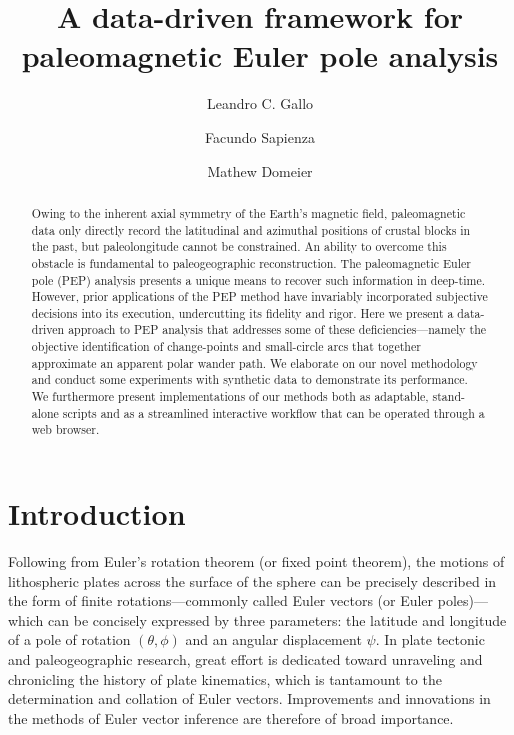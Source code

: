 \documentclass{article} %
\title{A data-driven framework for paleomagnetic Euler pole analysis}
\author[1\thanks{\tt{l.c.gallo@geo.uio.no}}]{Leandro C. Gallo\orcidA{}}
\author[2]{Facundo Sapienza\orcidB{}}
\author[1]{Mathew Domeier\orcidC{}}
\affil[1]{Centre for Earth Evolution and Dynamics, University of Oslo, Norway}
\affil[2]{Department of Statistics, University of California Berkeley, United States}
\begin{document}
  \begin{@twocolumnfalse} %
  
\maketitle

\begin{abstract}
Owing to the inherent axial symmetry of the Earth’s magnetic field, paleomagnetic data only directly record the latitudinal and azimuthal positions of crustal blocks in the past, but paleolongitude cannot be constrained. An ability to overcome this obstacle is fundamental to paleogeographic reconstruction. The paleomagnetic Euler pole (PEP) analysis presents a unique means to recover such information in deep-time. However, prior applications of the PEP method have invariably incorporated subjective decisions into its execution, undercutting its fidelity and rigor. Here we present a data-driven approach to PEP analysis that addresses some of these deficiencies---namely the objective identification of change-points and small-circle arcs that together approximate an apparent polar wander path. We elaborate on our novel methodology and conduct some experiments with synthetic data to demonstrate its performance. We furthermore present implementations of our methods both as adaptable, stand-alone scripts and as a streamlined interactive workflow that can be operated through a web browser.
\end{abstract}
\vspace{0.35cm}

  \end{@twocolumnfalse} %




\section{Introduction}
Following from Euler's rotation theorem (or fixed point theorem), the motions of lithospheric plates across the surface of the sphere can be precisely described in the form of finite rotations---commonly called Euler vectors (or Euler poles)---which can be concisely expressed by three parameters: the latitude and longitude of a pole of rotation $(\theta, \phi)$ and an angular displacement $\psi$. In plate tectonic and paleogeographic research, great effort is dedicated toward unraveling and chronicling the history of plate kinematics, which is tantamount to the determination and collation of Euler vectors. Improvements and innovations in the methods of Euler vector inference are therefore of broad importance.
\end{document}

